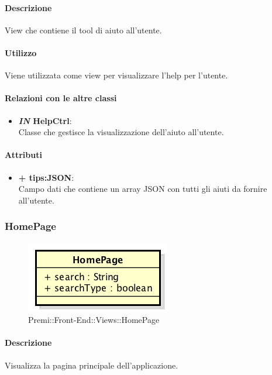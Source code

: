 	\paragraph{Descrizione}
	View che contiene il tool di aiuto all'utente.
	
	\paragraph{Utilizzo}
	Viene utilizzata come view per visualizzare l'help per l'utente.
	
	\paragraph{Relazioni con le altre classi}
	\begin{itemize}
		\item \textbf{\textit{IN} HelpCtrl}:\\
		Classe che gestisce la visualizzazione dell'aiuto all'utente.
	\end{itemize}
	
	\paragraph{Attributi}
	\begin{itemize}
		\item \textbf{+ tips:JSON}: \\
		Campo dati che contiene un array JSON con tutti gli aiuti da fornire all'utente.
	\end{itemize}
	
	
\subsubsection{HomePage}
	\begin{figure}[h]
		\centering
		\includegraphics[width=0.3\linewidth]{img/premi_front_end_views_homepage}
		\caption[Premi::Front-End::Views::HomePage]{Premi::Front-End::Views::HomePage}
	\end{figure}
	
	\paragraph{Descrizione}
	Visualizza la pagina principale dell'applicazione.
	

